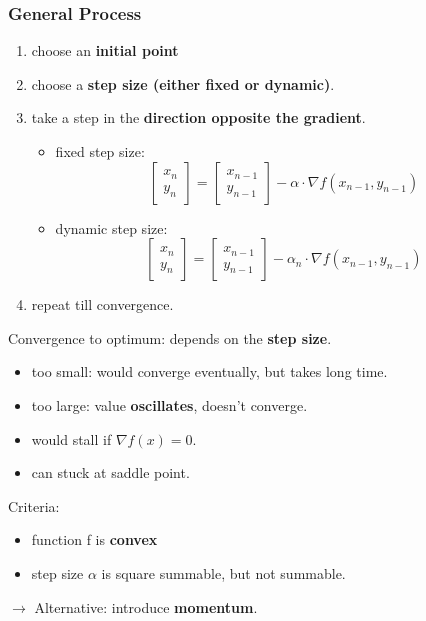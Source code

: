 \subsubsection{General Process}
\begin{enumerate}[label= \protect \circled{\arabic*} ]
	\item choose an \textbf{initial point}
	\item choose a \textbf{step size (either fixed or dynamic)}.
	\item take a step in the \textbf{direction opposite the gradient}.
	\begin{itemize}
		\item fixed step size:
		$$\begin{bmatrix}
		x_n \\y_n
		\end{bmatrix} = \begin{bmatrix}
		x_{n-1} \\ y_{n-1}
		\end{bmatrix} - \alpha \cdot \nabla f(x_{n-1}, y_{n-1})$$
		\item dynamic step size:
		$$\begin{bmatrix}
		x_n \\y_n
		\end{bmatrix} = \begin{bmatrix}
		x_{n-1} \\ y_{n-1}
		\end{bmatrix} - \alpha_{n} \cdot \nabla f(x_{n-1}, y_{n-1})$$
	\end{itemize}
	\item repeat till convergence.
\end{enumerate}

Convergence to optimum: depends on the \textbf{step size}. 
\begin{itemize}
	\item too small: would converge eventually, but takes long time.
	\item too large: value \textbf{oscillates}, doesn't converge.
	\item would stall if $\nabla f(x) = 0$. 
	\item can stuck at saddle point.
\end{itemize}
Criteria: 
\begin{itemize}
	\item function f is \textbf{convex}
	\item step size $\alpha$ is square summable, but not summable.
\end{itemize}
$\rightarrow$ Alternative: introduce \textbf{momentum}.


